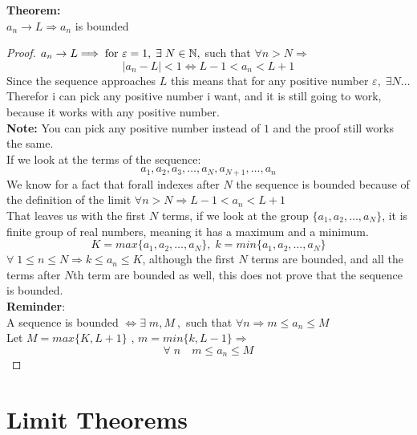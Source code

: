\noindent\textbf{Theorem:}\\
$a_n\rightarrow L \Longrightarrow a_n$ is bounded\\
\begin{proof}
    $a_n\rightarrow L \Longrightarrow \;\text{for } \varepsilon=1,\; \exists\; N\in \mathbb{N},$ such that $\forall n>N\Longrightarrow$
    \[
        |a_n-L|<1 \iff L-1<a_n<L+1
    \]
    Since the sequence approaches $L$ this means that for any positive number $\varepsilon,\; \exists N\ldots$\\
    Therefor i can pick any positive number i want, and it is still going to work, because it works with any positive number.\\
    \textbf{Note:} You can pick any positive number instead of $1$ and the proof still works the same.\\
    If we look at the terms of the sequence:
    \[
        a_1,a_2,a_3,\ldots,a_N,a_{N+1},\ldots,a_n
    \]
    We know for a fact that forall indexes after $N$ the sequence is bounded because of the definition of the limit $\forall n>N\Longrightarrow L-1<a_n<L+1$\\
    That leaves us with the first $N$ terms, if we look at the group $\{a_1,a_2,\ldots,a_N\}$, it is finite group of real numbers, meaning it has a maximum and a minimum.\\
    \[
        K=max\{a_1,a_2,\ldots,a_N\},\; k = min\{a_1,a_2,\ldots,a_N\}
    \]
    $\forall\; 1\leq n\leq N \Longrightarrow k\leq a_n\leq K$, although the first $N$ terms are bounded, and all the terms after $N$th term are bounded as well, this does not prove that the sequence is bounded.\\
    \textbf{Reminder}:\\
    A sequence is bounded $\iff \exists\; m,M\: ,$ such that $\forall n\Longrightarrow m\leq a_n\leq M$\\
    Let $M = max\{K,L+1\}$ , $m = min\{k,L-1\}\Longrightarrow$\\
    \[
    \forall\; n \quad m\leq a_n\leq M
    \]
\end{proof}


\section{Limit Theorems}
